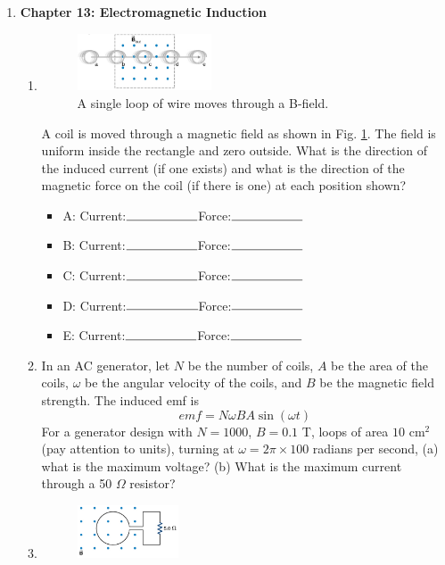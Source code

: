 \documentclass[10pt]{article}
\begin{document}
\begin{enumerate}
\item \textbf{Chapter 13: Electromagnetic Induction}
\begin{enumerate}
\item
\begin{figure}[ht]
\centering
\includegraphics[width=0.4\textwidth]{magdamp.png}
\caption{\label{fig:flux1} A single loop of wire moves through a B-field.}
\end{figure}
A coil is moved through a magnetic field as shown in Fig. \ref{fig:flux1}. The field is uniform inside the rectangle and zero outside. What is the direction of the induced current (if one exists) and what is the direction of the magnetic force on the coil (if there is one) at each position shown?
\begin{itemize}
\item A: Current:$\rule{2cm}{0.15mm}$Force:$\rule{2cm}{0.15mm}$
\item B: Current:$\rule{2cm}{0.15mm}$Force:$\rule{2cm}{0.15mm}$
\item C: Current:$\rule{2cm}{0.15mm}$Force:$\rule{2cm}{0.15mm}$
\item D: Current:$\rule{2cm}{0.15mm}$Force:$\rule{2cm}{0.15mm}$
\item E: Current:$\rule{2cm}{0.15mm}$Force:$\rule{2cm}{0.15mm}$
\end{itemize}
\item In an AC generator, let $N$ be the number of coils, $A$ be the area of the coils, $\omega$ be the angular velocity of the coils, and $B$ be the magnetic field strength.  The induced emf is
\begin{equation}
emf = N\omega BA\sin(\omega t)
\end{equation}
For a generator design with $N=1000$, $B=0.1$ T, loops of area $10$ cm$^2$ (pay attention to units), turning at $\omega = 2\pi\times 100$ radians per second, (a) what is the maximum voltage?  (b) What is the maximum current through a 50 $\Omega$ resistor? \\ \vspace{2cm}
\clearpage
\item
\begin{figure}
\centering
\includegraphics[width=0.3\textwidth]{loopsine.png}

\end{figure}
\end{enumerate}
\end{enumerate}
\end{document}
